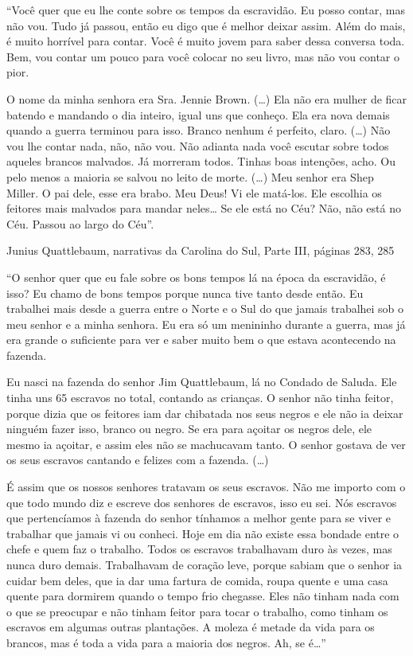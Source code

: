 ``Você quer que eu lhe conte sobre os tempos da escravidão. Eu posso
contar, mas não vou. Tudo já passou, então eu digo que é melhor deixar
assim. Além do mais, é muito horrível para contar. Você é muito jovem
para saber dessa conversa toda. Bem, vou contar um pouco para você
colocar no seu livro, mas não vou contar o pior.

O nome da minha senhora era Sra. Jennie Brown. (\ldots{}) Ela não era
mulher de ficar batendo e mandando o dia inteiro, igual uns que conheço.
Ela era nova demais quando a guerra terminou para isso. Branco nenhum é
perfeito, claro. (\ldots{}) Não vou lhe contar nada, não, não vou. Não
adianta nada você escutar sobre todos aqueles brancos malvados. Já
morreram todos. Tinhas boas intenções, acho. Ou pelo menos a maioria se
salvou no leito de morte. (\ldots{}) Meu senhor era Shep Miller. O pai
dele, esse era brabo. Meu Deus! Vi ele matá-los. Ele escolhia os
feitores mais malvados para mandar neles\ldots{} Se ele está no Céu?
Não, não está no Céu. Passou ao largo do Céu''.

Junius Quattlebaum, narrativas da Carolina do Sul, Parte III, páginas
283, 285

``O senhor quer que eu fale sobre os bons tempos lá na época da
escravidão, é isso? Eu chamo de bons tempos porque nunca tive tanto
desde então. Eu trabalhei mais desde a guerra entre o Norte e o Sul do
que jamais trabalhei sob o meu senhor e a minha senhora. Eu era só um
menininho durante a guerra, mas já era grande o suficiente para ver e
saber muito bem o que estava acontecendo na fazenda.

Eu nasci na fazenda do senhor Jim Quattlebaum, lá no Condado de Saluda.
Ele tinha uns 65 escravos no total, contando as crianças. O senhor não
tinha feitor, porque dizia que os feitores iam dar chibatada nos seus
negros e ele não ia deixar ninguém fazer isso, branco ou negro. Se era
para açoitar os negros dele, ele mesmo ia açoitar, e assim eles não se
machucavam tanto. O senhor gostava de ver os seus escravos cantando e
felizes com a fazenda. (\ldots{})

É assim que os nossos senhores tratavam os seus escravos. Não me importo
com o que todo mundo diz e escreve dos senhores de escravos, isso eu
sei. Nós escravos que pertencíamos à fazenda do senhor tínhamos a melhor
gente para se viver e trabalhar que jamais vi ou conheci. Hoje em dia
não existe essa bondade entre o chefe e quem faz o trabalho. Todos os
escravos trabalhavam duro às vezes, mas nunca duro demais. Trabalhavam
de coração leve, porque sabiam que o senhor ia cuidar bem deles, que ia
dar uma fartura de comida, roupa quente e uma casa quente para dormirem
quando o tempo frio chegasse. Eles não tinham nada com o que se
preocupar e não tinham feitor para tocar o trabalho, como tinham os
escravos em algumas outras plantações. A moleza é metade da vida para os
brancos, mas é toda a vida para a maioria dos negros. Ah, se é\ldots{}''

